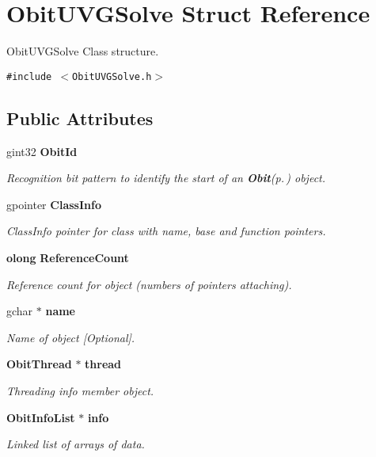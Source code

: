 \section{Obit\-UVGSolve Struct Reference}
\label{structObitUVGSolve}
Obit\-UVGSolve Class structure.  


{\tt \#include $<$Obit\-UVGSolve.h$>$}

\subsection*{Public Attributes}
\begin{CompactItemize}
\item 
gint32 {\bf Obit\-Id}
\begin{CompactList}\small\item\em Recognition bit pattern to identify the start of an {\bf Obit}{\rm (p.\,\pageref{structObit})} object. \item\end{CompactList}\item 
gpointer {\bf Class\-Info}
\begin{CompactList}\small\item\em Class\-Info pointer for class with name, base and function pointers. \item\end{CompactList}\item 
{\bf olong} {\bf Reference\-Count}
\begin{CompactList}\small\item\em Reference count for object (numbers of pointers attaching). \item\end{CompactList}\item 
gchar $\ast$ {\bf name}
\begin{CompactList}\small\item\em Name of object [Optional]. \item\end{CompactList}\item 
{\bf Obit\-Thread} $\ast$ {\bf thread}
\begin{CompactList}\small\item\em Threading info member object. \item\end{CompactList}\item 
{\bf Obit\-Info\-List} $\ast$ {\bf info}
\begin{CompactList}\small\item\em Linked list of arrays of data. \item\end{CompactList}\item 

\end{CompactItemize}
